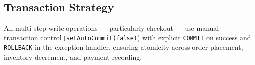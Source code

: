 \subsection{Transaction Strategy}
All multi-step write operations --- particularly checkout --- use manual
transaction control (\texttt{setAutoCommit(false)}) with explicit
\texttt{COMMIT} on success and \texttt{ROLLBACK} in the exception handler,
ensuring atomicity across order placement, inventory decrement, and payment
recording.